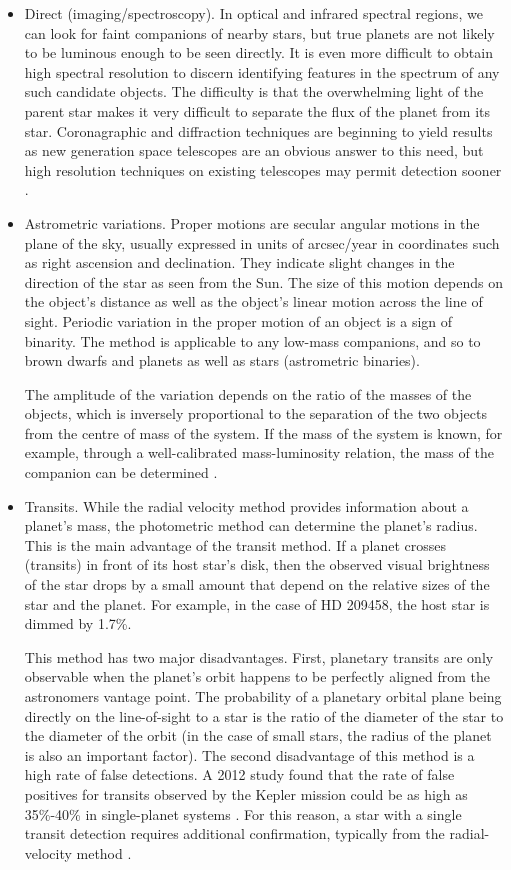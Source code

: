 \begin{itemize}
\item Direct (imaging/spectroscopy). In optical and infrared spectral regions, we can look for faint companions of
nearby stars, but true planets are not likely to be luminous enough to
be seen directly. It is even more difficult to obtain high spectral resolution 
to discern identifying features in the spectrum of any such candidate objects.
The difficulty is that the overwhelming light of the parent star makes it very difficult to
separate the flux of the planet from its star. Coronagraphic \citep{lyot1933}
and diffraction techniques are beginning to yield results as new generation space telescopes 
are an obvious answer to this need, but high resolution
techniques on existing telescopes may permit detection sooner \citep{milone2014}.

\item Astrometric variations.
Proper motions are secular angular motions in the plane of the sky, usually
expressed in units of arcsec/year in coordinates such as right ascension and declination.
They indicate slight changes in the direction of the star as seen from the Sun.
The size of this motion depends on the object's distance as well as the object's
linear motion across the line of sight. Periodic variation in the proper motion of
an object is a sign of binarity.
The method is applicable to any low-mass companions, and so to brown dwarfs
and planets as well as stars (astrometric binaries).

The amplitude of the variation depends on the ratio of the masses of the objects, which is inversely
proportional to the separation of the two objects from the centre of mass of the system.
If the mass of the system is known, for example, through a well-calibrated
mass-luminosity relation, the mass of the companion can be determined \citep{milone2014}.

\item Transits. While the radial velocity method provides information about a planet's mass, the photometric method can determine the planet's radius. This is the main advantage of the transit method. If a planet crosses (transits) in front of its host star's disk, then the observed visual brightness of the star drops by a small amount that depend on the relative sizes of the star and the planet. For example, in the case of HD 209458, the host star is dimmed by 1.7\%.

This method has two major disadvantages. First, planetary transits are only observable when the planet's orbit happens to be perfectly aligned from the astronomers vantage point. The probability of a planetary orbital plane being directly on the line-of-sight to a star is the ratio of the diameter of the star to the diameter of the orbit (in the case of small stars, the radius of the planet is also an important factor).
The second disadvantage of this method is a high rate of false detections. A 2012 study found that the rate of false positives for transits observed by the Kepler mission could be as high as 35\%-40\% in single-planet systems \citep{Santerne2012}. For this reason, a star with a single transit detection requires additional confirmation, typically from the radial-velocity method \cite{milone2014}.


\end{itemize}
